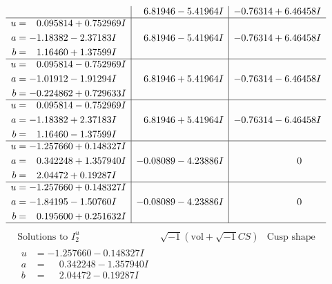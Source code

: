 \documentclass[1p]{elsarticle_modified}
\theoremstyle{definition}
\newcommand{\I}{\sqrt{-1}}
\begin{document}
$$\begin{array}{c|c|c}
 & \phantom{-}6.81946 - 5.41964 I & -0.76314 + 6.46458 I \\ \hline\begin{aligned}
u &= \phantom{-}0.095814 + 0.752969 I \\
a &= -1.18382 - 2.37183 I \\
b &= \phantom{-}1.16460 + 1.37599 I\end{aligned}
 & \phantom{-}6.81946 - 5.41964 I & -0.76314 + 6.46458 I \\ \hline\begin{aligned}
u &= \phantom{-}0.095814 - 0.752969 I \\
a &= -1.01912 - 1.91294 I \\
b &= -0.224862 + 0.729633 I\end{aligned}
 & \phantom{-}6.81946 + 5.41964 I & -0.76314 - 6.46458 I \\ \hline\begin{aligned}
u &= \phantom{-}0.095814 - 0.752969 I \\
a &= -1.18382 + 2.37183 I \\
b &= \phantom{-}1.16460 - 1.37599 I\end{aligned}
 & \phantom{-}6.81946 + 5.41964 I & -0.76314 - 6.46458 I \\ \hline\begin{aligned}
u &= -1.257660 + 0.148327 I \\
a &= \phantom{-}0.342248 + 1.357940 I \\
b &= \phantom{-}2.04472 + 0.19287 I\end{aligned}
 & -0.08089 - 4.23886 I & \phantom{-0.000000 } 0 \\ \hline\begin{aligned}
u &= -1.257660 + 0.148327 I \\
a &= -1.84195 - 1.50760 I \\
b &= \phantom{-}0.195600 + 0.251632 I\end{aligned}
 & -0.08089 - 4.23886 I & \phantom{-0.000000 } 0\\
 \hline 
 \end{array}$$\newpage$$\begin{array}{c|c|c}  
\text{Solutions to }I^u_{2}& \I (\text{vol} + \sqrt{-1}CS) & \text{Cusp shape}\\
 \hline 
\begin{aligned}
u &= -1.257660 - 0.148327 I \\
a &= \phantom{-}0.342248 - 1.357940 I \\
b &= \phantom{-}2.04472 - 0.19287 I\end{aligned}

\end{array}$$
\end{document}
